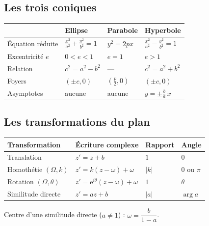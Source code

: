\subsection{Les trois coniques}
\begin{center}\small
\begin{tabular}{@{}p{2.6cm}p{3.6cm}p{3.2cm}p{3.6cm}@{}}
\toprule
& \textbf{Ellipse} & \textbf{Parabole} & \textbf{Hyperbole}\\
\midrule
Équation réduite & $\frac{x^2}{a^2}+\frac{y^2}{b^2}=1$ & $y^2=2px$ & $\frac{x^2}{a^2}-\frac{y^2}{b^2}=1$\\[4pt]
Excentricité $e$ & $0<e<1$ & $e=1$ & $e>1$\\[2pt]
Relation & $c^2=a^2-b^2$ & — & $c^2=a^2+b^2$\\[2pt]
Foyers & $(\pm c,0)$ & $\left(\frac p2,0\right)$ & $(\pm c,0)$\\[2pt]
Asymptotes & aucune & aucune & $y=\pm\frac ba\,x$\\
\bottomrule
\end{tabular}
\end{center}

\subsection{Les transformations du plan}
\begin{center}\small
\begin{tabular}{@{}p{3cm}p{4.2cm}p{2.4cm}p{2.4cm}@{}}
\toprule
\textbf{Transformation} & \textbf{Écriture complexe} & \textbf{Rapport} & \textbf{Angle}\\
\midrule
Translation & $z'=z+b$ & $1$ & $0$\\
Homothétie $(\Omega,k)$ & $z'=k(z-\omega)+\omega$ & $|k|$ & $0$ ou $\pi$\\
Rotation $(\Omega,\theta)$ & $z'=\mathrm{e}^{i\theta}(z-\omega)+\omega$ & $1$ & $\theta$\\
Similitude directe & $z'=az+b$ & $|a|$ & $\arg a$\\
\bottomrule
\end{tabular}
\end{center}
\noindent\footnotesize Centre d'une similitude directe ($a\ne1$) : $\omega=\dfrac{b}{1-a}$.\normalsize


